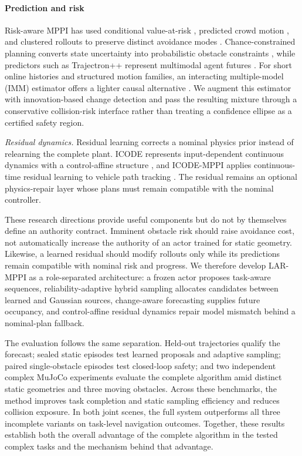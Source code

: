\documentclass[conference]{IEEEtran}
\newcommand{\method}{LAR-MPPI}
\begin{document}
\paragraph{Prediction and risk} Risk-aware MPPI has used conditional value-at-risk \cite{yin2023riskaware}, predicted crowd motion \cite{trevisan2025dynamic}, and clustered rollouts to preserve distinct avoidance modes \cite{patrick2024clustering}. Chance-constrained planning converts state uncertainty into probabilistic obstacle constraints \cite{blackmore2011chance}, while predictors such as Trajectron++ represent multimodal agent futures \cite{salzmann2020trajectron}. For short online histories and structured motion families, an interacting multiple-model (IMM) estimator offers a lighter causal alternative \cite{blom1988imm}. We augment this estimator with innovation-based change detection and pass the resulting mixture through a conservative collision-risk interface rather than treating a confidence ellipse as a certified safety region.

\textit{Residual dynamics.} Residual learning corrects a nominal physics prior instead of relearning the complete plant. ICODE represents input-dependent continuous dynamics with a control-affine structure \cite{li2024icode}, and ICODE-MPPI applies continuous-time residual learning to vehicle path tracking \cite{song2026icodemppi}.  The residual remains an optional physics-repair layer whose plans must remain compatible with the nominal controller.

These research directions provide useful components but do not by themselves define an authority contract. Imminent obstacle risk should raise avoidance cost, not automatically increase the authority of an actor trained for static geometry. Likewise, a learned residual should modify rollouts only while its predictions remain compatible with nominal risk and progress. We therefore develop \method{} as a role-separated architecture: a frozen actor proposes task-aware sequences, reliability-adaptive hybrid sampling allocates candidates between learned and Gaussian sources, change-aware forecasting supplies future occupancy, and control-affine residual dynamics repair model mismatch behind a nominal-plan fallback.

The evaluation follows the same separation. Held-out trajectories qualify the forecast; sealed static episodes test learned proposals and adaptive sampling; paired single-obstacle episodes test closed-loop safety; and two independent complex MuJoCo experiments evaluate the complete algorithm amid distinct static geometries and three moving obstacles. Across these benchmarks, the method improves task completion and static sampling efficiency and reduces collision exposure. In both joint scenes, the full system outperforms all three incomplete variants on task-level navigation outcomes. Together, these results establish both the overall advantage of the complete algorithm in the tested complex tasks and the mechanism behind that advantage.
\end{document}
